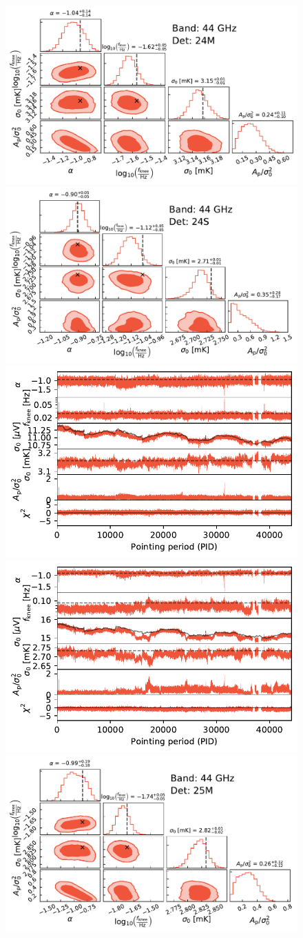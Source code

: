 \documentclass{aa}
\begin{document}
\begin{figure}[p]
        \begin{center}
                \includegraphics[width=0.495\linewidth]{figs/corner_band_044_det_1_mean_new.pdf}
                \includegraphics[width=0.495\linewidth]{figs/corner_band_044_det_2_mean_new.pdf}\\
                \includegraphics[width=0.495\linewidth]{figs/xi_vs_pid_band_044_det_1_mean_new.pdf}
                \includegraphics[width=0.495\linewidth]{figs/xi_vs_pid_band_044_det_2_mean_new.pdf}\\
                \vspace*{0.5mm}
                \includegraphics[width=0.495\linewidth]{figs/corner_band_044_det_3_mean_new.pdf}

\end{center}
\end{figure}
\end{document}
